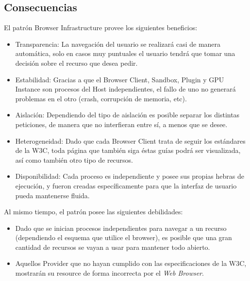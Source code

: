 \subsection{Consecuencias}
El patrón Browser Infrastructure provee los siguientes beneficios:
\begin{itemize}
	\item Transparencia: La navegación del usuario se realizará casi de manera automática, solo en casos muy puntuales el usuario tendrá que tomar una decisión sobre el recurso que desea pedir.
	\item Estabilidad: Gracias a que el Browser Client, Sandbox, Plugin y GPU Instance son procesos del Host independientes, el fallo de uno no generará problemas en el otro (crash, corrupción de memoria, etc).
	\item Aislación: Dependiendo del tipo de aislación es posible separar los distintas peticiones, de manera que no interfieran entre sí, a menos que se desee.
	\item Heterogeneidad: Dado que cada Browser Client trata de seguir los estándares de la W3C, toda página que también siga éstas guías podrá ser visualizada, así como también otro tipo de recursos.
	\item Disponibilidad: Cada proceso es independiente y posee sus propias hebras de ejecución, y fueron creadas específicamente para que la interfaz de usuario pueda mantenerse fluida.
\end{itemize}
Al mismo tiempo, el patrón posee las siguientes debilidades:
\begin{itemize}
	\item Dado que se inician procesos independientes para navegar a un recurso (dependiendo el esquema que utilice el browser), es posible que una gran cantidad de recursos se vayan a usar para mantener todo abierto.
	\item Aquellos Provider que no hayan cumplido con las especificaciones de la W3C, mostrarán su resource de forma incorrecta por el \textit{Web Browser}.
\end{itemize}
